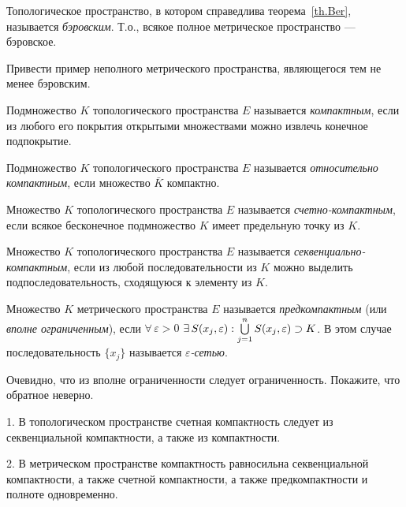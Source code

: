 \documentclass[10pt,titlepage, a4paper]{article}
\begin{document}
Топологическое пространство, в котором справедлива
теорема~\ref{th.Ber}, называется \emph{бэровским}. Т.о., всякое
полное метрическое пространство --- бэровское.

\begin{upr}
Привести пример неполного метрического пространства, являющегося тем
не менее бэровским.
\end{upr}



\begin{defen}
Подмножество $K$ топологического пространства $E$ называется
\emph{компактным}, если из любого его покрытия открытыми множествами
можно извлечь конечное подпокрытие.

Подмножество $K$ топологического пространства $E$ называется
\emph{относительно компактным}, если множество $\bar{K}$ компактно.

Множество $K$ топологического пространства $E$ называется
\emph{счетно-компактным}, если всякое бесконечное подмножество $K$
имеет предельную точку из $K$.

Множество $K$ топологического пространства $E$ называется
\emph{сек\-вен\-ци\-аль\-но-компактным}, если из любой
последовательности из $K$ можно выделить подпоследовательность,
сходящуюся к элементу из $K$.

Множество $K$ метрического пространства $E$ называется
\emph{предкомпак\-тным} (или \emph{вполне ограниченным}), если
$\forall\,\varepsilon>0$
$\exists\,S(x_j,\varepsilon):\bigcup\limits_{j=1}^n
S(x_j,\varepsilon)\p\supset K$. В этом случае последовательность
$\{x_j\}$ называется \emph{$\varepsilon$-сетью}.
\end{defen}

\begin{upr}
Очевидно, что из вполне ограниченности следует ограниченность.
Покажите, что обратное неверно.
\end{upr}
\lecture

\begin{theorem}
1. В топологическом пространстве счетная компактность следует из
секвенциальной компактности, а также из компактности.

2. В метрическом пространстве компактность равносильна
секвенциальной компактности, а также счетной компактности, а также
предкомпактности и полноте одновременно.
\end{theorem}
\end{document}

